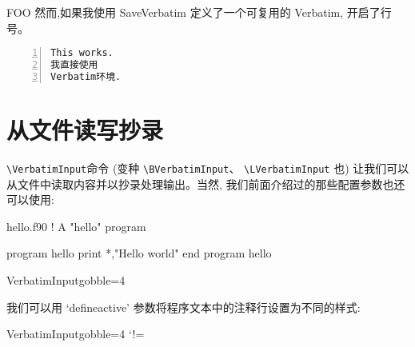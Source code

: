 \documentclass[twoside]{article}
\newcommand\cs[1]{\texttt{\textbackslash#1}}
\newcommand\verbatimTxt{抄录}
\begin{document}
\begin{SideBySideExample}
\begin{SaveVerbatim}{FOO}
然而,如果我使用
SaveVerbatim
定义了一个可复用的
Verbatim,
开启了行号。
\end{SaveVerbatim}

\begin{Verbatim}[numbers=left]
This works.
我直接使用
Verbatim环境.
\end{Verbatim}

\end{SideBySideExample}


\clearpage

\section{从文件读写抄录}
\label{sec:VerbatimInclude}

  \cs{VerbatimInput}命令 (变种 \cs{BVerbatimInput}、
\cs{LVerbatimInput} 也) 让我们可以从文件中读取内容并以{\verbatimTxt}处理输出。当然, 我们前面介绍过的那些配置参数也还可以使用:

%The file we will use for \VerbatimInput

\typeout{*************************************}
\typeout{*************************************}

\begin{VerbatimOut}{hello.f90}
  ! A "hello" program

  program hello
    print *,"Hello world"
  end program hello
\end{VerbatimOut}

\begin{SideBySideExample}
  \RecustomVerbatimCommand{\VerbatimInput}
  {VerbatimInput}{gobble=4}



\end{SideBySideExample}

我们可以用 `defineactive' 参数将程序文本中的注释行设置为不同的样式:

\begin{SideBySideExample}
  \RecustomVerbatimCommand{\VerbatimInput}
  {VerbatimInput}{gobble=4}
  \def\ExclamationPoint{\char33}
  \catcode`!=\active
  \VerbatimInput%
    [defineactive=%
      \def!{\color{cyan}\itshape
        \ExclamationPoint}]
    {hello.f90}
\end{SideBySideExample}
\end{document}

